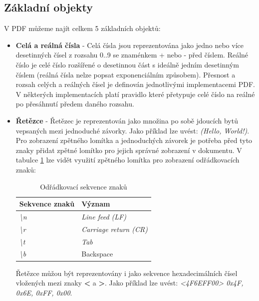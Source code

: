 		\subsection{Základní objekty}
V PDF můžeme najít celkem 5 základních objektů:
	\begin{itemize}
		\item \textbf{Celá a reálná čísla} - Celá čísla jsou reprezentována jako jedno nebo více desetinných čísel z rozsahu 0..9 se znaménkem + nebo - před číslem. Reálné číslo je celé číslo rozšířené o desetinnou část s ideálně jedním desetinným číslem (reálná čísla nelze popsat exponenciálním způsobem). Přesnost a rozsah celých a reálných čísel je definován jednotlivými implementacemi PDF. V některých implementacích platí pravidlo které přetypuje celé číslo na reálné po přesáhnutí předem daného rozsahu.
		\item \textbf{Řetězce} - Řetězec je reprezentován jako množina po sobě jdoucích bytů vepsaných mezi jednoduché závorky. Jako příklad lze uvést: \textit{(Hello, World!)}. Pro zobrazení zpětného lomítka a jednoduchých závorek je potřeba před tyto znaky přidat zpětné lomítko pro jejich správné zobrazení v dokumentu. V tabulce \ref{fig:table_escaped} lze vidět využití zpětného lomítka pro zobrazení odřádkovacích znaků:
			\begin{table}[h!]
			\centering
			\begin{tabular}{|l|l|} 
			\hline
			\textbf{Sekvence znaků}    & \textbf{Význam}                \\ 
			\hline
			\textit{\textbackslash{}n} & \textit{Line feed (LF)}        \\ 
			\hline
			\textit{\textbackslash{}r} & \textit{Carriage return (CR)}  \\ 
			\hline
			\textit{\textbackslash{}t} & \textit{Tab}                   \\ 
			\hline
			\textit{\textbackslash{}b} & Backspace                      \\
			\hline
			\end{tabular}
			\caption{Odřádkovací sekvence znaků}
			\label{fig:table_escaped}
			\end{table}
		\newline Řetězce můžou být reprezentovány i jako sekvence hexadecimálních čísel vložených mezi znaky \textbf{<} a \textbf{>}. 
		\newline Jako příklad lze uvést: \textit{<4F6EFF00> \textrightarrow 0x4F, 0x6E, 0xFF, 0x00}.


\end{itemize}
